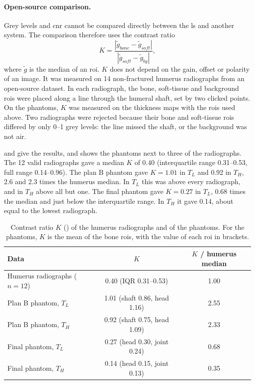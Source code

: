 \paragraph{Open-source comparison.} Grey levels and \gls{cnr} cannot be compared directly between the \gls{ls} and another system. The comparison therefore uses the contrast ratio
\begin{equation}
    K = \frac{|\tilde{g}_{bone} - \tilde{g}_{soft}|}{|\tilde{g}_{soft} - \tilde{g}_{bg}|},
    \label{eq:contrast_ratio}
\end{equation}
where $\tilde{g}$ is the median of an \gls{roi}. $K$ does not depend on the gain, offset or polarity of an image. It was measured on 14 non-fractured humerus radiographs from an open-source dataset. %
In each radiograph, the bone, soft-tissue and background \glspl{roi} were placed along a line through the humeral shaft, set by two clicked points. On the phantoms, $K$ was measured on the thickness maps with the \glspl{roi} used above. Two radiographs were rejected because their bone and soft-tissue \glspl{roi} differed by only 0--1 grey levels: the line missed the shaft, or the background was not air.

 and  give the results, and  shows the phantoms next to three of the radiographs. The 12 valid radiographs gave a median $K$ of 0.40 (interquartile range 0.31--0.53, full range 0.14--0.96). The plan B phantom gave $K = 1.01$ in $T_L$ and 0.92 in $T_H$, 2.6 and 2.3 times the humerus median. In $T_L$ this was above every radiograph, and in $T_H$ above all but one. The final phantom gave $K = 0.27$ in $T_L$, 0.68 times the median and just below the interquartile range. In $T_H$ it gave 0.14, about equal to the lowest radiograph.

\begin{table}[htbp]
    \centering
    \caption{Contrast ratio $K$ () of the humerus radiographs and of the phantoms. For the phantoms, $K$ is the mean of the bone \glspl{roi}, with the value of each \gls{roi} in brackets.}
    \label{tab:analysis_K}
    \small
    \begin{tabular}{|l|c|c|}
    \hline
    \textbf{Data} & $K$ & $K$ \textbf{/ humerus median}\\
    \hline
    Humerus radiographs ($n = 12$) & 0.40 (IQR 0.31--0.53) & 1.00\\
    \hline
    Plan B phantom, $T_L$ & 1.01 (shaft 0.86, head 1.16) & 2.55\\
    Plan B phantom, $T_H$ & 0.92 (shaft 0.75, head 1.09) & 2.33\\
    \hline
    Final phantom, $T_L$  & 0.27 (head 0.30, joint 0.24) & 0.68\\
    Final phantom, $T_H$  & 0.14 (head 0.15, joint 0.13) & 0.35\\
    \hline
    \end{tabular}
\end{table}

